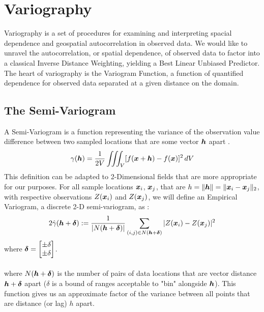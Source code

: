 \documentclass[11pt]{ucthesis}
\newcommand{\vect}[1]{{\it{\boldsymbol{#1}}}}
\begin{document}
\newpage

\section{Variography}
Variography is a set of procedures for examining and interpreting spacial dependence and geospatial autocorrelation in observed data. We would like to unravel the autocorrelation, or spatial dependence, of observed data to factor into a classical Inverse Distance Weighting, yielding a Best Linear Unbiased Predictor. The heart of variography is the Variogram Function, a function of quantified dependence for observed data separated at a given distance on the domain.

\subsection{The Semi-Variogram}
A Semi-Variogram is a function representing the variance of the observation value difference between two sampled locations that are some vector $\vect{h}$ apart \cite{matheron:geostat}.
\begin{equation}
	\gamma(\vect{h})=\frac{1}{2V}\iiint_V [f(\vect{x}+\vect{h})-f(\vect{x})]^2 \,dV \\
\end{equation}
This definition can be adapted to 2-Dimensional fields that are more appropriate for our purposes. For all sample locations $\vect{x}_{i}$, $\vect{x}_{j}$, that are $h=\|\vect{h}\|=\|\vect{x}_{i} - \vect{x}_{j} \|_{2}$, with respective observations $Z(\vect{x}_{i})$ and $Z(\vect{x}_{j})$, we will define an Empirical Variogram, a discrete 2-D semi-variogram, as \cite{cressie:spatial}:
\begin{equation}
	2\hat{\gamma}(\vect{h}+\vect{\delta}) := \frac{1}{|N(\vect{h}+\vect{\delta})|}\sum\limits_{(i,j)\in N(\vect{h}+\vect{\delta})}|Z(\vect{x}_i) - Z(\vect{x}_j)|^2 %
\end{equation}
where $\vect{\delta}=\begin{bmatrix}\pm\delta\\ \pm\delta\end{bmatrix}$.\\\\
where $N(\vect{h}+\vect{\delta})$ is the number of pairs of data locations that are vector distance $\vect{h}+\vect{\delta}$ apart ($\delta$ is a bound of ranges acceptable to "bin" alongside $\vect{h}$).
This function gives us an approximate factor of the variance between all points that are distance (or lag) $h$ apart.\cite{cressie:spatial}
\end{document}
